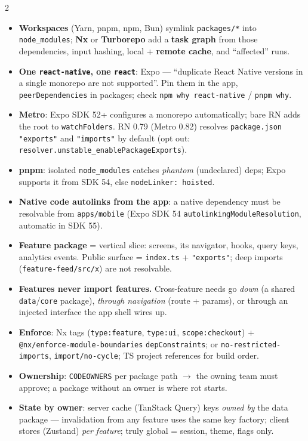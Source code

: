 \documentclass[8pt]{extarticle}
\newcommand\ct[1]{\texttt{#1}}
\newcommand\hd[1]{\par\vspace{3pt}\noindent{\bfseries\color{sheetBlue}#1}\par\vspace{1pt}}
\begin{document}
\begin{multicols}{2}
\raggedright\footnotesize{}

\hd{The repo}
\begin{itemize}
  \item \textbf{Workspaces} (Yarn, pnpm, npm, Bun) symlink \ct{packages/*} into
        \ct{node\_modules}; \textbf{Nx} or \textbf{Turborepo} add a \textbf{task graph} from those
        dependencies, input hashing, local + \textbf{remote cache}, and ``affected'' runs.
  \item \textbf{One \ct{react-native}, one \ct{react}}: Expo — ``duplicate React Native versions
        in a single monorepo are not supported''. Pin them in the app, \ct{peerDependencies} in
        packages; check \ct{npm why react-native} / \ct{pnpm why}.
  \item \textbf{Metro}: Expo SDK 52+ configures a monorepo automatically; bare RN adds the root
        to \ct{watchFolders}. RN 0.79 (Metro 0.82) resolves \ct{package.json} \ct{"exports"}
        and \ct{"imports"} by default (opt out: \ct{resolver.unstable\_enablePackageExports}).
  \item \textbf{pnpm}: isolated \ct{node\_modules} catches \emph{phantom} (undeclared) deps;
        Expo supports it from SDK 54, else \ct{nodeLinker: hoisted}.
  \item \textbf{Native code autolinks from the app}: a native dependency must be resolvable from
        \ct{apps/mobile} (Expo SDK 54 \ct{autolinkingModuleResolution}, automatic in SDK 55).
\end{itemize}

\hd{Packages and boundaries}
\begin{itemize}
  \item \textbf{Feature package} = vertical slice: screens, its navigator, hooks, query keys,
        analytics events. Public surface = \ct{index.ts} + \ct{"exports"}; deep imports
        (\ct{feature-feed/src/x}) are not resolvable.
  \item \textbf{Features never import features.} Cross-feature needs go \emph{down} (a shared
        \ct{data}/\ct{core} package), \emph{through navigation} (route + params), or through an
        injected interface the app shell wires up.
  \item \textbf{Enforce}: Nx tags (\ct{type:feature}, \ct{type:ui}, \ct{scope:checkout}) +
        \ct{@nx/enforce-module-boundaries} \ct{depConstraints}; or \ct{no-restricted-imports},
        \ct{import/no-cycle}; TS project references for build order.
  \item \textbf{Ownership}: \ct{CODEOWNERS} per package path $\to$ the owning team must approve;
        a package without an owner is where rot starts.
  \item \textbf{State by owner}: server cache (TanStack Query) keys \emph{owned by} the data
        package — invalidation from any feature uses the same key factory; client stores
        (Zustand) \emph{per feature}; truly global = session, theme, flags only.
\end{itemize}


\end{multicols}
\end{document}
